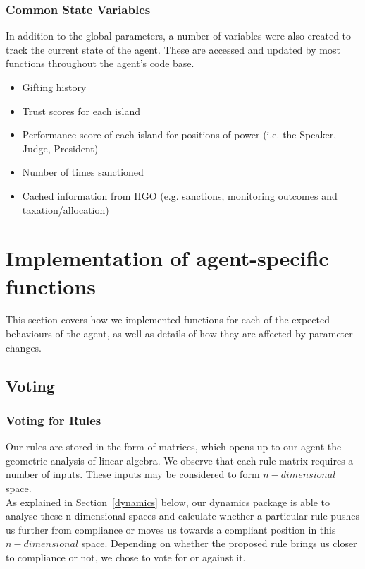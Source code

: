 \subsubsection{Common State Variables}
In addition to the global parameters, a number of variables were also created to track the current state of the agent. These are accessed and updated by most functions throughout the agent's code base. 
\begin{itemize}
\item Gifting history
\item Trust scores for each island 
\item Performance score of each island for positions of power (i.e. the Speaker, Judge, President)
\item Number of times sanctioned
\item Cached information from IIGO (e.g. sanctions, monitoring outcomes and taxation/allocation)
\end{itemize}

\section{Implementation of agent-specific functions}
\label{section_func_team3}

This section covers how we implemented functions for each of the expected behaviours of the agent, as well as details of how they are affected by parameter changes.

\subsection{Voting}

\subsubsection{Voting for Rules}
Our rules are stored in the form of matrices, which opens up to our agent the geometric analysis of linear algebra. We observe that each rule matrix requires a number of inputs. These inputs may be considered to form $n-dimensional$ space. \\
As explained in Section~\ref{dynamics} below, our dynamics package is able to analyse these n-dimensional spaces and calculate whether a particular rule pushes us further from compliance or moves us towards a compliant position in this $n-dimensional$ space. Depending on whether the proposed rule brings us closer to compliance or not, we chose to vote for or against it.

